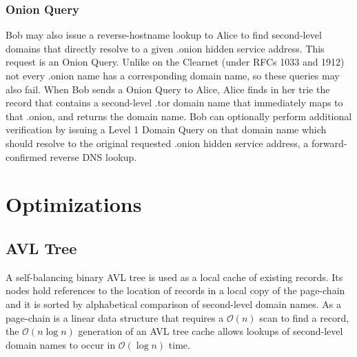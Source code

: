 \subsubsection{Onion Query}

Bob may also issue a reverse-hostname lookup to Alice to find second-level domains that directly resolve to a given .onion hidden service address. This request is an Onion Query. Unlike on the Clearnet (under RFCs 1033 and 1912) not every .onion name has a corresponding domain name, so these queries may also fail. When Bob sends a Onion Query to Alice, Alice finds in her trie the record that contains a second-level .tor domain name that immediately maps to that .onion, and returns the domain name. Bob can optionally perform additional verification by issuing a Level 1 Domain Query on that domain name which should resolve to the original requested .onion hidden service address, a forward-confirmed reverse DNS lookup.







\section{Optimizations}



\subsection{AVL Tree}
\label{sec:AVLTree}

A self-balancing binary AVL tree is used as a local cache of existing records. Its nodes hold references to the location of records in a local copy of the page-chain and it is sorted by alphabetical comparison of second-level domain names. As a page-chain is a linear data structure that requires a $ \mathcal{O}(n) $ scan to find a record, the $ \mathcal{O}(n\log{}n) $ generation of an AVL tree cache allows lookups of second-level domain names to occur in $ \mathcal{O}(\log{}n) $ time.





